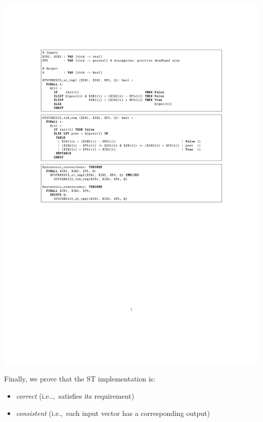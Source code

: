 \documentclass[a0,landscape]{a0poster}
\def\graphspacing{\vspace{.5cm}}
\newcommand{\capcolor}[1]{{\color{Black} #1}}
\begin{document}
\begin{multicols}{4}
\begin{center}\graphspacing
\includegraphics[width=\linewidth]{figures/hysteresis/hysteresis_pvs_tab_req}
\end{center}\graphspacing

\noindent Finally, we prove that the ST implementation is:
\begin{itemize}
\item {\color{BrickRed} \emph{correct}} (i.e..,~satisfies its requirement)
\item {\color{BrickRed} \emph{consistent}} (i.e.,~each input vector has a corresponding output)
\end{itemize}


\end{multicols}
\end{document}
